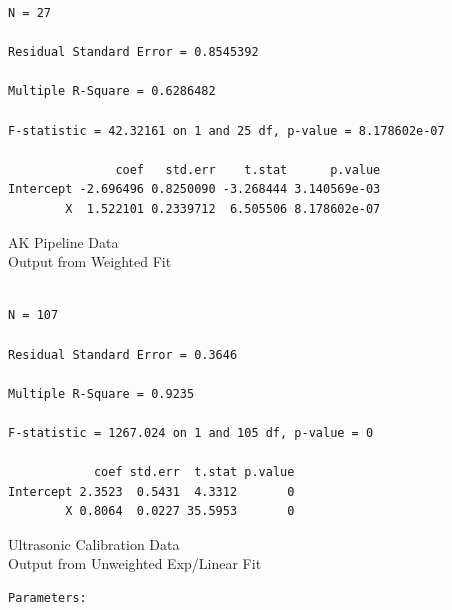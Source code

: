 {{{\begin{verbatim}
N = 27

Residual Standard Error = 0.8545392

Multiple R-Square = 0.6286482

F-statistic = 42.32161 on 1 and 25 df, p-value = 8.178602e-07

               coef   std.err    t.stat      p.value 
Intercept -2.696496 0.8250090 -3.268444 3.140569e-03
        X  1.522101 0.2339712  6.505506 8.178602e-07
\end{verbatim}
}
\clearpage
\begin{figure}
\end{figure}
\begin{figure}
\end{figure}
\begin{figure}
\end{figure}
\clearpage
\newpage
\begin{center}
AK Pipeline Data \\
Output from Weighted Fit 
\end{center}
\vspace{0.5in}
{\large
\begin{verbatim}

N = 107

Residual Standard Error = 0.3646

Multiple R-Square = 0.9235

F-statistic = 1267.024 on 1 and 105 df, p-value = 0

            coef std.err  t.stat p.value 
Intercept 2.3523  0.5431  4.3312       0
        X 0.8064  0.0227 35.5953       0
\end{verbatim}
}
\clearpage
\begin{figure}
\end{figure}
\begin{figure}
\end{figure}
\begin{figure}
\end{figure}
\clearpage
\newpage
\begin{center}
Ultrasonic Calibration Data \\
Output from Unweighted Exp/Linear Fit
\end{center}
\vspace{0.5in}
{\large
\begin{verbatim}
Parameters:


\end{verbatim}}}}
